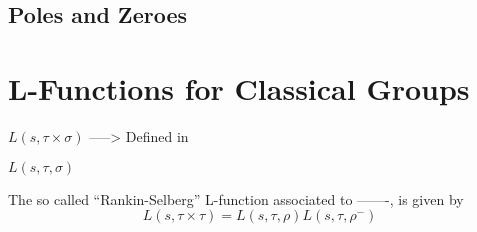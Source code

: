 \subsection{Poles and Zeroes}


\section{L-Functions for Classical Groups}

\(L(s, \tau\times \sigma)\)
\cite{remarks on rankin selberg convolutions Cogdel and PT-shapiro}\cite{cogdellFunctorialityClassicalGroups2004} -----> Defined in \cite{shahidiProofLanglandsConjecture1990}

\(L(s, \tau, \sigma)\)
\cite{grbacResidualSpectrumSplit2011}

\begin{example}[]
	The so called ``Rankin-Selberg'' L-function associated to -------, is given by 
	\[L(s, \tau\times \tau) = L(s, \tau, \rho)L(s, \tau, \rho^-)\]	
\end{example}
